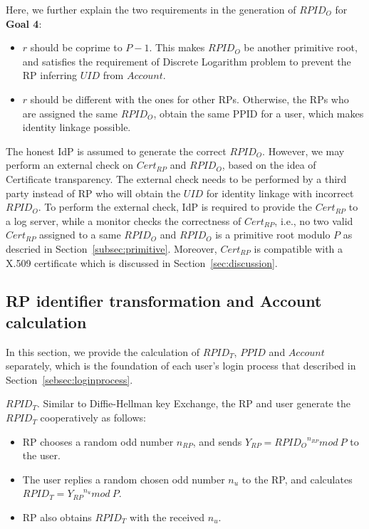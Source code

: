 Here, we further explain the two requirements in the generation of $RPID_O$ for \textbf{Goal 4}:
\begin{itemize}
  \item $r$ should be coprime to $P-1$. This makes $RPID_O$ be another primitive root, and satisfies the requirement of Discrete Logarithm problem to prevent the RP  inferring $UID$ from $Account$.
  \item $r$ should be different with the ones for other RPs. Otherwise, the RPs who are assigned the same $RPID_O$, obtain the same PPID for a user, which makes identity linkage possible.
\end{itemize}

The honest IdP is assumed to generate the correct $RPID_O$. However, we may perform an external check on $Cert_{RP}$ and $RPID_O$, based on the idea of Certificate transparency. The external check needs to be performed by a third party instead of RP who will obtain the $UID$ for identity linkage with incorrect $RPID_O$. To perform the external check, IdP is required to provide the $Cert_{RP}$ to a log server, while a monitor checks the correctness of $Cert_{RP}$, i.e., no two valid $Cert_{RP}$ assigned to a same $RPID_O$ and $RPID_O$ is a primitive root modulo $P$ as descried in Section~\ref{subsec:primitive}. Moreover, $Cert_{RP}$ is compatible with a X.509 certificate which is discussed in Section~\ref{sec:discussion}.

\subsection{RP identifier transformation and Account calculation}
\label{subsec:identifier-generation}
In this section, we provide the calculation of $RPID_T$, $PPID$ and $Account$ separately, which is the foundation of each user's login process that described in Section~\ref{sebsec:loginprocess}.

{$RPID_T$}. Similar to Diffie-Hellman key Exchange\cite{DiffieH76}, the RP and user generate the  $RPID_T$ cooperatively as follows:
\begin{itemize}
  \item RP chooses a random odd number $n_{RP}$, and sends $Y_{RP} = {RPID_O}^{n_{RP}} mod \ P$ to the user.
  \item The user replies a random chosen odd number $n_{u}$ to the RP, and calculates $RPID_T = {Y_{RP}}^{n_{u}} mod \ P$.
  \item RP also obtains $RPID_T$ with the received $n_{u}$.
\end{itemize}

